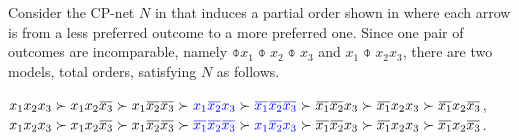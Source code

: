 Consider the CP-net $N$ in 
that induces a partial order shown in 
where each arrow is from a less preferred outcome to a more preferred one.
Since one pair of outcomes are incomparable,
namely $\obar{x_1}\obar{x_2}\obar{x_3}$ and $x_1\obar{x_2}x_3$,
there are two models, total orders, satisfying $N$ as follows.

\begin{center}
	$x_1x_2x_3 \succ x_1x_2\obar{x_3} \succ x_1\obar{x_2}\obar{x_3} 
		\succ \bluetext{x_1\obar{x_2}x_3} \succ \bluetext{\obar{x_1}\obar{x_2}\obar{x_3}} 
		\succ \obar{x_1}\obar{x_2}x_3 \succ \obar{x_1}x_2x_3 \succ \obar{x_1}x_2\obar{x_3}$,\\
	$x_1x_2x_3 \succ x_1x_2\obar{x_3} \succ x_1\obar{x_2}\obar{x_3} 
		\succ \bluetext{\obar{x_1}\obar{x_2}\obar{x_3}} \succ \bluetext{x_1\obar{x_2}x_3}
		\succ \obar{x_1}\obar{x_2}x_3 \succ \obar{x_1}x_2x_3 \succ \obar{x_1}x_2\obar{x_3}$.
\end{center}


